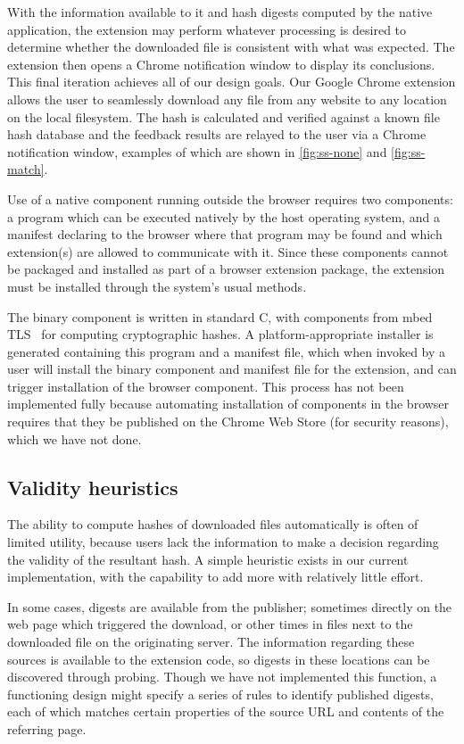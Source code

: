 \documentclass[letterpaper,twocolumn,10pt]{article}
\begin{document}
With the information available to it and hash digests computed by the native application,
the extension may perform whatever processing is desired to determine whether the
downloaded file is consistent with what was expected.
The extension then opens a Chrome notification window to display its conclusions.
This final iteration achieves all of our design goals. Our Google Chrome extension allows
the user to seamlessly download any file from any website to any location on the local
filesystem. The hash is calculated and verified against a known file hash database and
the feedback results are relayed to the user via a Chrome notification window, examples
of which are shown in \autoref{fig:ss-none} and \autoref{fig:ss-match}.

Use of a native component running outside the browser requires two components:
a program which can be executed natively by the host operating system, and a manifest
declaring to the browser where that program may be found and which extension(s) are
allowed to communicate with it. Since these components cannot be packaged and installed
as part of a browser extension package, the extension must be installed through the
system's usual methods.

The binary component is written in standard C, with components from mbed TLS~\cite{mbedtls}
for computing cryptographic hashes. A platform-appropriate installer is generated containing
this program and a manifest file, which when invoked by a user will install the binary component
and manifest file for the extension, and can trigger installation of the browser component.
This process has not been implemented fully because automating installation of components
in the browser requires that they be published on the Chrome Web Store (for security reasons),
which we have not done.

\subsection{Validity heuristics}

The ability to compute hashes of downloaded files automatically is often of limited utility,
because users lack the information to make a decision regarding the validity of the
resultant hash. A simple heuristic exists in our current implementation, with the capability
to add more with relatively little effort.

In some cases, digests are available from the publisher; sometimes directly on the web page
which triggered the download, or other times in files next to the downloaded file on the
originating server. The information regarding these sources is available to the extension
code, so digests in these locations can be discovered through probing. Though we have not
implemented this function, a functioning design might specify a series of rules to identify
published digests, each of which matches certain properties of the source URL and
contents of the referring page.
\end{document}
